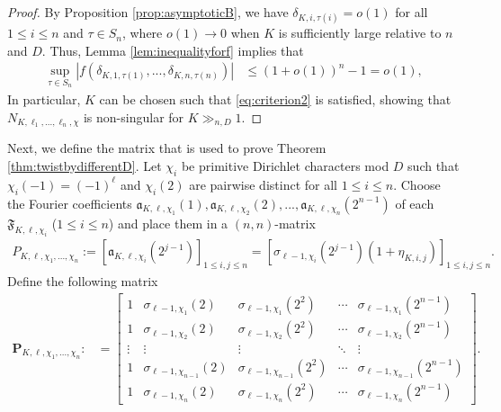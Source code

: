 \documentclass[11pt,letterpaper,reqno]{amsart}
\makeatletter
\numberwithin{figure}{section}
\numberwithin{table}{section}
\theoremstyle{definition}
\theoremstyle{plain}
\theoremstyle{definition}
\theoremstyle{definition}
\theoremstyle{remark}
\numberwithin{equation}{section}
\theoremstyle{remark}
\def\subsection{\@startsection{subsection}{2}%
  \z@{.5\linespacing\@plus.7\linespacing}{.3\linespacing}%
  {\normalfont\bfseries}}
\makeatother
\begin{document}
\begin{proof}
    By Proposition \ref{prop:asymptoticB}, we have $\delta_{K,i,\tau(i)}=o(1)$ for all $1\leq i\leq n$ and $\tau\in S_n$,    where $o(1)\rightarrow0$ when $K$ is sufficiently large relative to $n$ and $D$. Thus, Lemma \ref{lem:inequalityforf} implies that 
    \begin{align*}
          \sup_{\tau\in S_n}|f(\delta_{K,1,\tau(1)},...,\delta_{K,n,\tau(n)})|&\leq(1+o(1))^n-1=o(1),
    \end{align*}
  In particular, $K$ can be chosen such that \eqref{eq:criterion2} is satisfied, showing that $N_{K,\ell_1,...,\ell_n,\chi}$ is non-singular for $K\gg_{n,D}1$.
\end{proof}
Next, we define the matrix that is used to prove Theorem \ref{thm:twistbydifferentD}.
Let $\chi_i$ be primitive Dirichlet characters mod $D$ such that $\chi_i(-1)=(-1)^{\ell}$  and $\chi_i(2)$ are pairwise distinct for all $1\leq i\leq n$. Choose the Fourier coefficients $\mathfrak{a}_{K,\ell,\chi_1}(1), \mathfrak{a}_{K,\ell,\chi_2}(2),...,\mathfrak{a}_{K,\ell,\chi_n}(2^{n-1})$ of each $\mathfrak{F}_{K,\ell,\chi_i}$ ($1\leq i\leq n$) and place them in a $(n,n)$-matrix
\begin{align}
    P_{K,\ell, \chi_1,...,\chi_n}:=\left[\mathfrak{a}_{K,\ell,\chi_i}(2^{j-1})\right]_{1\leq i,j\leq n}=\left[\sigma_{\ell-1,\chi_i}(2^{j-1})(1+\eta_{K,i,j})\right]_{1\leq i,j\leq n}.\label{eq:matrix3}
\end{align}
Define the following matrix
\begin{align}
\mathbf{P}_{K,\ell,\chi_1,...,\chi_n}:&=\begin{bmatrix}
        1 & \sigma_{\ell-1,\chi_1}(2) & \sigma_{\ell-1,\chi_1}(2^2) & \cdots & \sigma_{\ell-1,\chi_1}(2^{n-1})\\
        1 &  \sigma_{\ell-1,\chi_2}(2) &  \sigma_{\ell-1,\chi_2}(2^2) & \cdots &  \sigma_{\ell-1,\chi_2}(2^{n-1})\\
        \vdots & \vdots & \vdots & \ddots & \vdots\\
        1 & \sigma_{\ell-1,\chi_{n-1}}(2) & \sigma_{\ell-1,\chi_{n-1}}(2^2) & \cdots & \sigma_{\ell-1,\chi_{n-1}}(2^{n-1})\\ 
        1 & \sigma_{\ell-1,\chi_n}(2) & \sigma_{\ell-1,\chi_n}(2^2) & \cdots & \sigma_{\ell-1,\chi_n}(2^{n-1})
    \end{bmatrix}.\label{eq:limitmatrixtype3}
\end{align}
\end{document}
